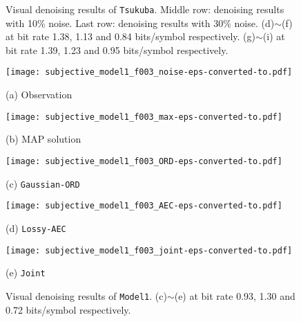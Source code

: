 \begin{figure}[t]
\caption{Visual denoising results of \texttt{Tsukuba}. Middle row: denoising results with 10\% noise. Last row: denoising results with 30\% noise. (d)\;$\sim$\;(f) at bit rate 1.38, 1.13 and 0.84 bits/symbol respectively. (g)\;$\sim$\;(i) at bit rate 1.39, 1.23 and 0.95 bits/symbol respectively.}
\label{fig:subjective_synthetic}
\end{figure}


\begin{figure}[t]

\begin{minipage}[b]{.48\linewidth}
  \centering
  \centerline{\texttt{[image: subjective\_model1\_f003\_noise-eps-converted-to.pdf]}}
  \centerline{(a) Observation}\medskip
\end{minipage}
\hfill
\begin{minipage}[b]{0.48\linewidth}
  \centering
  \centerline{\texttt{[image: subjective\_model1\_f003\_max-eps-converted-to.pdf]}}
  \centerline{(b) MAP solution}\medskip
\end{minipage}
\vfill

\begin{minipage}[b]{.32\linewidth}
  \centering
  \centerline{\texttt{[image: subjective\_model1\_f003\_ORD-eps-converted-to.pdf]}}
  \centerline{(c) \texttt{Gaussian-ORD}}\medskip
\end{minipage}
\hfill
\begin{minipage}[b]{0.32\linewidth}
  \centering
  \centerline{\texttt{[image: subjective\_model1\_f003\_AEC-eps-converted-to.pdf]}}
  \centerline{(d) \texttt{Lossy-AEC}}\medskip
\end{minipage}
\hfill
\begin{minipage}[b]{0.32\linewidth}
  \centering
  \centerline{\texttt{[image: subjective\_model1\_f003\_joint-eps-converted-to.pdf]}}
  \centerline{(e) \texttt{Joint}}\medskip
\end{minipage}


\caption{Visual denoising results of \texttt{Model1}. (c)\;$\sim$\;(e) at bit rate 0.93, 1.30 and 0.72 bits/symbol respectively.}
\label{fig:subjective_silhouette}
\end{figure}


